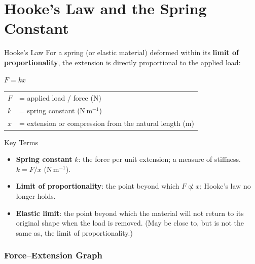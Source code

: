\section{Hooke's Law and the Spring Constant}

\begin{formulabox}{Hooke's Law}
For a spring (or elastic material) deformed within its \textbf{limit of proportionality}, the extension is directly proportional to the applied load:
\begin{center}
\Large $F = kx$
\end{center}
\vspace{0.3em}
\begin{tabular}{@{}ll@{}}
$F$ & = applied load / force (N) \\
$k$ & = spring constant (N\,m$^{-1}$) \\
$x$ & = extension or compression from the natural length (m) \\
\end{tabular}
\end{formulabox}

\begin{definitionbox}{Key Terms}
\begin{itemize}[itemsep=3pt]
  \item \textbf{Spring constant} $k$: the force per unit extension; a measure of stiffness. $k = F/x$ (N\,m$^{-1}$).
  \item \textbf{Limit of proportionality}: the point beyond which $F \not\propto x$; Hooke's law no longer holds.
  \item \textbf{Elastic limit}: the point beyond which the material will not return to its original shape when the load is removed. (May be close to, but is not the same as, the limit of proportionality.)
\end{itemize}
\end{definitionbox}

\subsubsection*{Force--Extension Graph}


